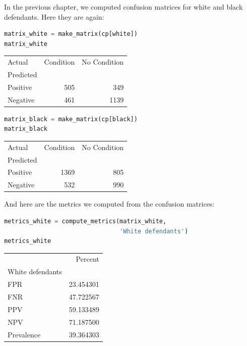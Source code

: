 In the previous chapter, we computed confusion matrices for white and
black defendants. Here they are again:

\begin{lstlisting}[language=Python]
matrix_white = make_matrix(cp[white])
matrix_white
\end{lstlisting}

\begin{tabular}{lrr}
\toprule
Actual &  Condition &  No Condition \\
Predicted &            &               \\
\midrule
Positive  &        505 &           349 \\
Negative  &        461 &          1139 \\
\bottomrule
\end{tabular}

\begin{lstlisting}[language=Python]
matrix_black = make_matrix(cp[black])
matrix_black
\end{lstlisting}

\begin{tabular}{lrr}
\toprule
Actual &  Condition &  No Condition \\
Predicted &            &               \\
\midrule
Positive  &       1369 &           805 \\
Negative  &        532 &           990 \\
\bottomrule
\end{tabular}

And here are the metrics we computed from the confusion matrices:

\begin{lstlisting}[language=Python]
metrics_white = compute_metrics(matrix_white, 
                                'White defendants')
metrics_white
\end{lstlisting}

\begin{tabular}{lr}
\toprule
{} &    Percent \\
White defendants &            \\
\midrule
FPR              &  23.454301 \\
FNR              &  47.722567 \\
PPV              &  59.133489 \\
NPV              &  71.187500 \\
Prevalence       &  39.364303 \\
\bottomrule
\end{tabular}

